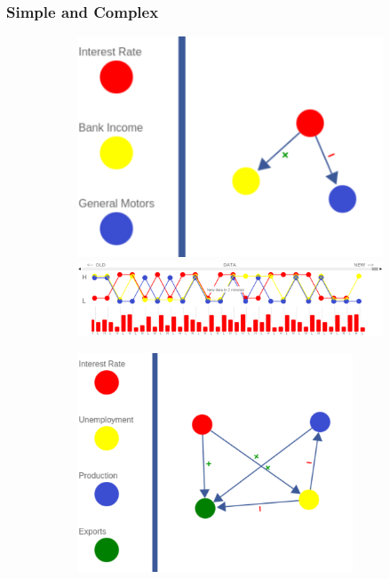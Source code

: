 \documentclass{beamer}
\begin{document}
\begin{frame}
\frametitle{Simple and Complex}
\begin{figure}
        \centering
       \begin{subfigure}{0.45\textwidth}
        \includegraphics[width=\textwidth]{SimpleModel.pdf}
        
        \includegraphics[width=\textwidth]{SimpleData.pdf}
                         \end{subfigure} \begin{subfigure}{0.45\textwidth}
        \includegraphics[width=0.9\textwidth]{Complex.pdf}


\end{subfigure}
\end{figure}
\end{frame}
\end{document}
